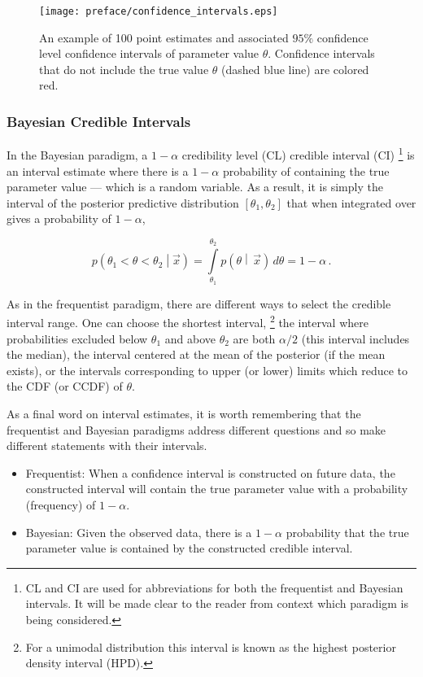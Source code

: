 \begin{figure}[htbp]
 \centering
 \texttt{[image: preface/confidence\_intervals.eps]}
 \caption[Simulation of 100 $95\%$ confidence level confidence intervals]{%
  An example of 100 point estimates and associated $95\%$ confidence level confidence intervals of parameter value $\theta$.
  Confidence intervals that do not include the true value $\theta$ (dashed blue line) are colored red.}
 \label{fig:confidence_intervals}
\end{figure}

\subsubsection{Bayesian Credible Intervals}

In the Bayesian paradigm, a $1-\alpha$ credibility level (CL) credible interval (CI)%
\footnote{CL and CI are used for abbreviations for both the frequentist and Bayesian intervals.
 It will be made clear to the reader from context which paradigm is being considered.}
is an interval estimate where there is a $1-\alpha$ probability of containing the true parameter value --- which is a random variable.
As a result, it is simply the interval of the posterior predictive distribution $\left[\theta_{1}, \theta_{2}\right]$ that when integrated over gives a probability of $1-\alpha$,

\begin{equation}
 p\left(\theta_{1} < \theta < \theta_{2}\middle|\vec{x}\right) = \int\limits_{\theta_{1}}^{\theta_{2}} p\left(\theta\middle|\,\vec{x}\right)\,d\theta = 1-\alpha\,.
 \label{eq:credible_interval_coverage}
\end{equation}

As in the frequentist paradigm, there are different ways to select the credible interval range.
One can choose the shortest interval,%
\footnote{For a unimodal distribution this interval is known as the highest posterior density interval (HPD).}
the interval where probabilities excluded below $\theta_{1}$ and above $\theta_{2}$ are both $\alpha/2$ (this interval includes the median), the interval centered at the mean of the posterior (if the mean exists), or the intervals corresponding to upper (or lower) limits which reduce  to the CDF (or CCDF) of $\theta$.

As a final word on interval estimates, it is worth remembering that the frequentist and Bayesian paradigms address different questions and so make different statements with their intervals.
\begin{itemize}
 \item Frequentist: When a confidence interval is constructed on future data, the constructed interval will contain the true parameter value with a probability (frequency) of $1-\alpha$.
 \item Bayesian: Given the observed data, there is a $1-\alpha$ probability that the true parameter value is contained by the constructed credible interval.
\end{itemize}
